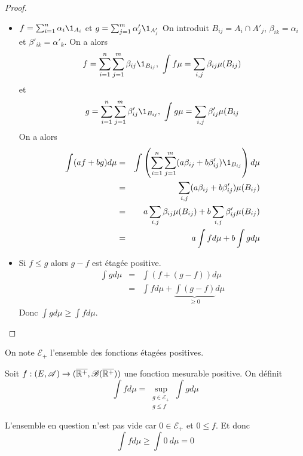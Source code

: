 \begin{proof}
	\begin{itemize}
		\item $ f = \sum_{i=1}^n \alpha_i \1_{A_i} $ et $ g = \sum_{j=1}^m \alpha'_j \1_{A'_j} $
		      On introduit $B_{ij} = A_i \cap A'_j$, $\beta_{ik} = \alpha_i$ et $\beta'_{ik} = \alpha'_k$.
		      On a alors
		      $$ f = \sum_{i=1}^n \sum_{j=1}^m \beta_{ij} \1_{B_{ij}}, \ \int f \mu = \sum_{i,j} \beta_{ij} \mu(B_{ij}) $$
		      et
		      $$ g = \sum_{i=1}^n \sum_{j=1}^m \beta'_{ij} \1_{B_{ij}}, \ \int g \mu = \sum_{i,j} \beta'_{ij} \mu(B_{ij} $$
		      On a alors
		      \begin{eqnarray*}
			      \int (af + bg) d\mu & = & \int \left( \sum_{i=1}^n \sum_{j=1}^m (a\beta_{ij} + b\beta'_{ij}) \1_{B_{ij}} \right) d\mu \\
			      & = & \sum_{i,j} (a\beta_{ij} + b\beta'_{ij}) \mu(B_{ij}) \\
			      & = & a \sum_{i,j} \beta_{ij} \mu(B_{ij}) + b \sum_{i,j} \beta'_{ij} \mu(B_{ij}) \\
			      & = & a \int f d\mu + b \int g d\mu
		      \end{eqnarray*}
		\item Si $f \leq g$ alors $g - f $ est étagée positive.
		      \begin{eqnarray*}
			      \int g d\mu & = & \int (f + (g-f)) d\mu \\
			      & = & \int f d\mu + \underbrace{\int (g-f)}_{\geq 0} d\mu
		      \end{eqnarray*}
		      Donc $\int g d\mu \geq \int f d\mu$.
	\end{itemize}
\end{proof}

\begin{notation}
	On note $\mathcal{E}_+$ l'ensemble des fonctions étagées positives.
\end{notation}

\begin{definition}
	Soit $f: (E, \mathscr{A}) \to (\overline{\mathbb{R}^+}, \mathscr{B}(\overline{\mathbb{R}^+}))$ une fonction mesurable positive.
	On définit
	$$ \int f d\mu = \sup\limits_{\substack{g \in \mathcal{E}_+ \\ g \leq f}} \int g d\mu $$
\end{definition}

\begin{remarque}
	L'ensemble en question n'est pas vide car $0 \in \mathcal{E}_+$ et $0 \leq f$. Et donc
	$$ \int f d\mu \geq \int 0 \ d\mu = 0 $$
\end{remarque}

